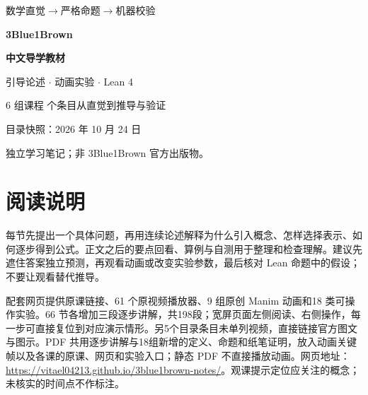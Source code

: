 \documentclass[UTF8,11pt,oneside,fontset=fandol]{ctexbook}
\begin{document}
\begin{titlepage}
\color{ink}
\vspace*{16mm}
{\Large 数学直觉\quad $\longrightarrow$\quad 严格命题\quad $\longrightarrow$\quad 机器校验\par}
\vspace{17mm}
{\Huge\bfseries 3Blue1Brown\par}
\vspace{5mm}
{\Huge\bfseries 中文导学教材\par}
\vspace{8mm}
{\LARGE 引导论述 $\cdot$ 动画实验 $\cdot$ Lean 4\par}
\vspace{15mm}
\vfill
{\large 6 组课程 个条目\quad 从直觉到推导与验证\par}
\vspace{6mm}
{\large 目录快照：2026 年 10 月 24 日\par}
{\normalsize 独立学习笔记；非 3Blue1Brown 官方出版物。\par}
\end{titlepage}
\frontmatter
\chapter{阅读说明}
\begingroup\small
每节先提出一个具体问题，再用连续论述解释为什么引入概念、怎样选择表示、如何逐步得到公式。正文之后的要点回看、算例与自测用于整理和检查理解。建议先遮住答案独立预测，再观看动画或改变实验参数，最后核对 Lean 命题中的假设；不要让观看替代推导。

配套网页提供原课链接、61 个原视频播放器、9 组原创 Manim 动画和18 类可操作实验。66 节各增加三段逐步讲解，共198段；宽屏页面左侧阅读、右侧操作，每一步可直接复位到对应演示情形。另5个目录条目未单列视频，直接链接官方图文与图示。PDF 共用逐步讲解与18组新增的定义、命题和纸笔证明，放入动画关键帧以及各课的原课、网页和实验入口；静态 PDF 不直接播放动画。网页地址：\url{https://vitael04213.github.io/3blue1brown-notes/}。观课提示定位应关注的概念；未核实的时间点不作标注。
\end{document}
